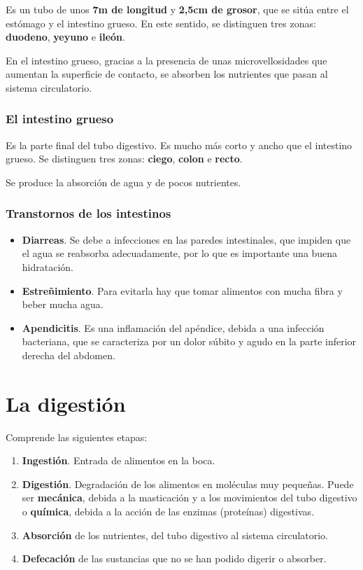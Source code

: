 \documentclass{article}
\begin{document}
				Es un tubo de unos \textbf{7m de longitud} y \textbf{2,5cm de grosor}, 
				que se sitúa entre el estómago y el intestino grueso. En este sentido, 
				se distinguen tres zonas: \textbf{duodeno}, \textbf{yeyuno} e
				\textbf{ileón}. \par
				
				En el intestino grueso, gracias a la presencia de unas microvellosidades
				que aumentan la superficie de contacto, se absorben los nutrientes que 
				pasan al sistema circulatorio.
				
				
			\subsubsection*{El intestino grueso}
			
				Es la parte final del tubo digestivo. Es mucho más corto y ancho que el 
				intestino grueso. Se distinguen tres zonas:  \textbf{ciego},
				\textbf{colon} e \textbf{recto}. \par
				
				Se produce la absorción de agua y de pocos nutrientes.
			
			\subsubsection*{Transtornos de los intestinos}
			
				\begin{itemize}
					\item \textbf{Diarreas}. Se debe a infecciones en las paredes intestinales, que impiden que el agua se reabsorba adecuadamente,
						por lo que es importante una buena hidratación.
					\item \textbf{Estreñimiento}. Para evitarla hay que tomar alimentos 
					con mucha fibra y beber mucha agua.
					\item \textbf{Apendicitis}. Es una inflamación del apéndice, debida a una infección bacteriana, que se caracteriza por un dolor súbito y agudo en la parte inferior derecha del abdomen.
				\end{itemize}
				
	\section{La digestión}
	
		Comprende las siguientes etapas:
		
		\begin{enumerate}
			\item \textbf{Ingestión}. Entrada de alimentos en la boca.
			\item \textbf{Digestión}. Degradación de los alimentos en moléculas muy pequeñas. Puede ser \textbf{mecánica}, debida a la masticación y a los movimientos del tubo digestivo o \textbf{química}, debida a la acción de las enzimas (proteínas) digestivas.
			\item \textbf{Absorción} de los nutrientes, del tubo digestivo al sistema circulatorio.
			\item \textbf{Defecación} de las sustancias que no se han podido digerir o absorber.
		\end{enumerate}
						
\end{document}
